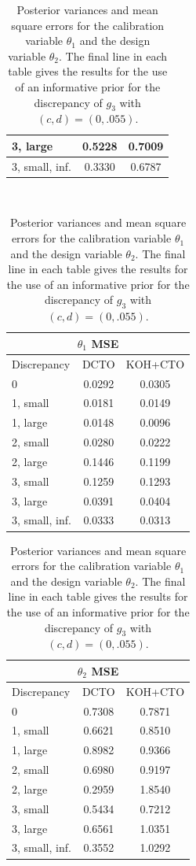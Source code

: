 \documentclass[12pt]{article}
\begin{document}
\begin{table}[]
\begin{tabular}{lcc}
3, large        & 0.5228  & 0.7009 \\ \hline
3, small, inf.  & 0.3330  & 0.6787 \\ \hline
\end{tabular}\\
\vspace{.25in}
\begin{tabular}{lcc}
\multicolumn{3}{c}{$\theta_1$ MSE} \\ \hline
Discrepancy     & DCTO    & KOH+CTO    \\ \hline
0               & 0.0292  & 0.0305 \\ \hline
1, small        & 0.0181  & 0.0149 \\ \hline
1, large        & 0.0148  & 0.0096 \\ \hline
2, small        & 0.0280  & 0.0222 \\ \hline
2, large        & 0.1446  & 0.1199 \\ \hline
3, small        & 0.1259  & 0.1293 \\ \hline
3, large        & 0.0391  & 0.0404 \\ \hline
3, small, inf.  & 0.0333  & 0.0313 \\ \hline
\end{tabular}
\hspace{.5in}
\begin{tabular}{lcc}
\multicolumn{3}{c}{$\theta_2$ MSE} \\ \hline
Discrepancy     & DCTO    & KOH+CTO    \\ \hline
0               & 0.7308  & 0.7871 \\ \hline
1, small        & 0.6621  & 0.8510 \\ \hline
1, large        & 0.8982  & 0.9366 \\ \hline
2, small        & 0.6980  & 0.9197 \\ \hline
2, large        & 0.2959  & 1.8540 \\ \hline
3, small        & 0.5434  & 0.7212 \\ \hline
3, large        & 0.6561  & 1.0351 \\ \hline
3, small, inf.  & 0.3552  & 1.0292 \\ \hline
\end{tabular}
\caption{Posterior variances and mean square errors for the calibration variable $\theta_1$ and the design variable $\theta_2$. The final line in each table gives the results for the use of an informative prior for the discrepancy of $g_3$ with $(c,d)=(0,.055)$.} 
\label{table:vars_and_mses}
\end{table}
\end{document}
